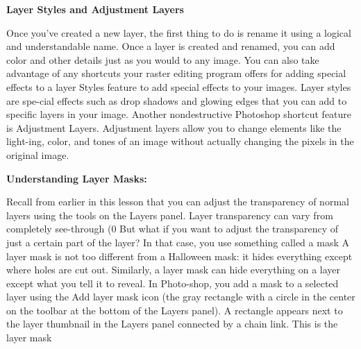 \documentclass{report}
\begin{document}
    \bigbreak \noindent \bigbreak \noindent 
    \begin{large}
      \textbf{Layer Styles and Adjustment Layers}
    \end{large}
    \bigbreak \noindent 
    Once you’ve created a new layer, the first thing to do is rename it using a logical and understandable name.
    \bigbreak \noindent 
    Once a layer is created and renamed, you can add color and other details just as you would to any image. You can also take advantage of any shortcuts your raster editing program offers for adding special effects to a layer
    \bigbreak \noindent 
    Styles feature to add special effects to your images. Layer styles are spe-cial effects such as drop shadows and glowing edges that you can add to specific layers in your image.
    \bigbreak \noindent 
    \bigbreak \noindent 
    Another nondestructive Photoshop shortcut feature is Adjustment Layers. Adjustment layers allow you to change elements like the light-ing, color, and tones of an image without actually changing the pixels in the original image.
  
    \bigbreak \noindent \bigbreak \noindent 
    \begin{large}
      \textbf{Understanding Layer Masks:}
    \end{large}
    \bigbreak \noindent 
    Recall from earlier in this lesson that you can adjust the transparency of normal layers using the tools on the Layers panel. Layer transparency can vary from completely see-through (0%
    \bigbreak \noindent 
    But what if you want to adjust the transparency of just a certain part of the layer? In that case, you use something called a mask
    \bigbreak \noindent 
    A layer mask is not too different from a Halloween mask: it hides everything except where holes are cut out. Similarly, a layer mask can hide everything on a layer except what you tell it to reveal. In Photo-shop, you add a mask to a selected layer using the Add layer mask icon (the gray rectangle with a circle in the center on the toolbar at the bottom of the Layers panel). A rectangle appears next to the layer thumbnail in the Layers panel connected by a chain link. This is the layer mask
\end{document}
